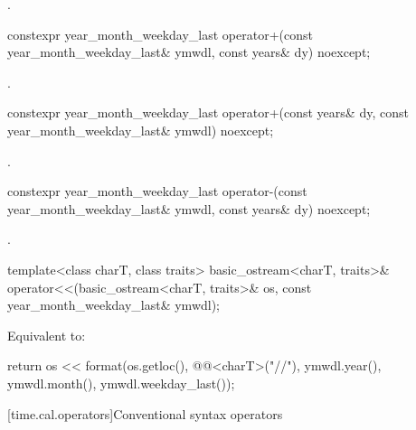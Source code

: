 \begin{itemdescr}
\pnum
\returns
{}.
\end{itemdescr}

%
\begin{itemdecl}
constexpr year_month_weekday_last
  operator+(const year_month_weekday_last& ymwdl, const years& dy) noexcept;
\end{itemdecl}

\begin{itemdescr}
\pnum
\returns
{}.
\end{itemdescr}

%
\begin{itemdecl}
constexpr year_month_weekday_last
  operator+(const years& dy, const year_month_weekday_last& ymwdl) noexcept;
\end{itemdecl}

\begin{itemdescr}
\pnum
\returns
{}.
\end{itemdescr}

%
\begin{itemdecl}
constexpr year_month_weekday_last
  operator-(const year_month_weekday_last& ymwdl, const years& dy) noexcept;
\end{itemdecl}

\begin{itemdescr}
\pnum
\returns
{}.
\end{itemdescr}

%
\begin{itemdecl}
template<class charT, class traits>
  basic_ostream<charT, traits>&
    operator<<(basic_ostream<charT, traits>& os, const year_month_weekday_last& ymwdl);
\end{itemdecl}

\begin{itemdescr}
\pnum
\effects
Equivalent to:
\begin{codeblock}
return os << format(os.getloc(), @@<charT>("{}/{}/{}"),
                    ymwdl.year(), ymwdl.month(), ymwdl.weekday_last());
\end{codeblock}
\end{itemdescr}

[time.cal.operators]{Conventional syntax operators}

